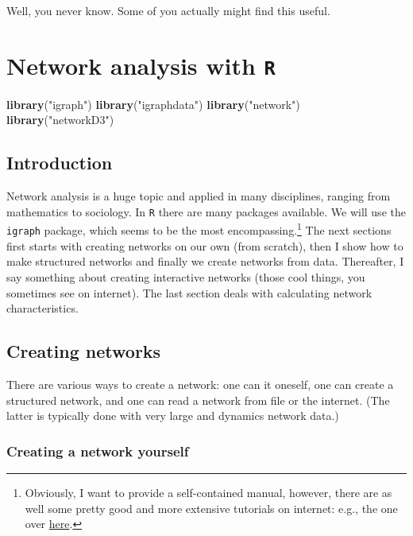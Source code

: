 \documentclass[]{article}
\newenvironment{Shaded}{\begin{snugshade}}{\end{snugshade}}
\newcommand{\KeywordTok}[1]{\textcolor[rgb]{0.13,0.29,0.53}{\textbf{{#1}}}}
\newcommand{\StringTok}[1]{\textcolor[rgb]{0.31,0.60,0.02}{{#1}}}
\newcommand{\NormalTok}[1]{{#1}}
\let\rmarkdownfootnote\footnote%
\def\footnote{\protect\rmarkdownfootnote}
\theoremstyle{definition}
\theoremstyle{definition}
\theoremstyle{definition}
\theoremstyle{remark}
\begin{document}
Well, you never know. Some of you actually might find this useful.

\section{\texorpdfstring{Network analysis with
\texttt{R}}{Network analysis with R}}\label{network-analysis-with-r}

\begin{Shaded}
\begin{Highlighting}[]
\KeywordTok{library}\NormalTok{(}\StringTok{"igraph"}\NormalTok{)}
\KeywordTok{library}\NormalTok{(}\StringTok{"igraphdata"}\NormalTok{)}
\KeywordTok{library}\NormalTok{(}\StringTok{"network"}\NormalTok{)}
\KeywordTok{library}\NormalTok{(}\StringTok{"networkD3"}\NormalTok{)}
\end{Highlighting}
\end{Shaded}

\subsection{Introduction}\label{introduction-1}

Network analysis is a huge topic and applied in many disciplines,
ranging from mathematics to sociology. In \texttt{R} there are many
packages available. We will use the \texttt{igraph} package, which seems
to be the most encompassing.\footnote{Obviously, I want to provide a
  self-contained manual, however, there are as well some pretty good and
  more extensive tutorials on internet: e.g., the one over
  \href{http://kateto.net/networks-r-igraph/}{here}.} The next sections
first starts with creating networks on our own (from scratch), then I
show how to make structured networks and finally we create networks from
data. Thereafter, I say something about creating interactive networks
(those cool things, you sometimes see on internet). The last section
deals with calculating network characteristics.

\subsection{Creating networks}\label{creating-networks}

There are various ways to create a network: one can it oneself, one can
create a structured network, and one can read a network from file or the
internet. (The latter is typically done with very large and dynamics
network data.)

\subsubsection{Creating a network
yourself}\label{creating-a-network-yourself}
\end{document}
